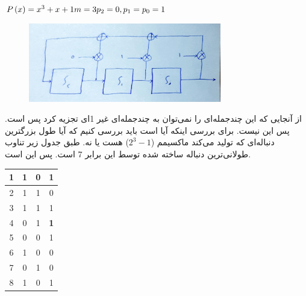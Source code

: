 \documentclass{article}
\begin{document}
\subsubsection{}
\begin{latin}
$
P\left( x \right) = x ^ 3 + x + 1\\
m = 3\\
p_2 = 0,  p_1 = p_0 = 1
$
\end{latin}
\begin{figure}[H]
    \centering
    \includegraphics[width=0.75\textwidth]{figures/2.jpg}
    \caption
	{}
    \label{fig:fig1}
\end{figure}
از آنجایی که این چندجمله‌ای را نمی‌توان به چندجمله‌ای غیر 1ای تجزیه کرد پس  است. پس این   نیست. برای بررسی اینکه آیا  است باید بررسی کنیم که آیا طول بزرگترین دنباله‌ای که تولید می‌کند ماکسیمم ($2^3 - 1$) هست یا نه. طبق جدول زیر تناوب طولانی‌ترین دنباله ساخته شده توسط این  برابر 7 است. پس این   است.
\begin{latin}
\begin{longtable}[c]{c|c|c|c|}
\cline{2-4}
1 & 1 & 0 & 1          \\ \cline{2-4} 
\endfirsthead
%
\endhead
%
2 & 1 & 1 & 0          \\ \cline{2-4} 
3 & 1 & 1 & 1          \\ \cline{2-4} 
4 & 0 & 1 & \textbf{1} \\ \cline{2-4} 
5 & 0 & 0 & 1          \\ \cline{2-4} 
6 & 1 & 0 & 0          \\ \cline{2-4} 
7 & 0 & 1 & 0          \\ \cline{2-4} 
8 & 1 & 0 & 1          \\ \cline{2-4} 
\end{longtable}
\end{latin}
\end{document}
